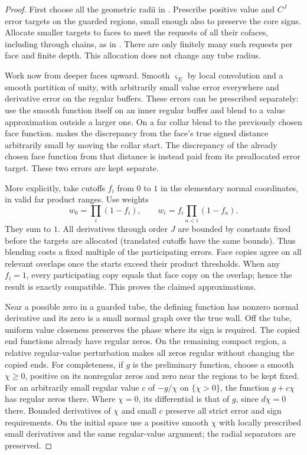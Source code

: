 \begin{proof}
First choose all the geometric radii in .  Prescribe
positive value and $C^J$ error targets on the guarded regions, small
enough also to preserve the core signs.  Allocate smaller targets to
faces to meet the requests of all their cofaces, including through
chains, as in .  There are only finitely many
such requests per face and finite depth.  This allocation does not
change any tube radius.

Work now from deeper faces upward.  Smooth $\varsigma_E$ by local
convolution and a smooth partition of unity, with arbitrarily small
value error everywhere and derivative error on the regular buffers.
These errors can be prescribed separately: use the smooth function
itself on an inner regular buffer and blend to a value approximation
outside a larger one.  On a far collar blend to the previously chosen
face function.   makes the discrepancy from the
face's true signed distance arbitrarily small by moving the collar
start.  The discrepancy of the already chosen face function from that
distance is instead paid from its preallocated error target.  These
two errors are kept separate.

More explicitly, take cutoffs $f_i$ from $0$ to $1$ in the elementary
normal coordinates, in valid far product ranges.  Use weights
\[
 w_0=\prod_i(1-f_i),\qquad
 w_i=f_i\prod_{a<i}(1-f_a).
\]
They sum to $1$.  All derivatives through order $J$ are bounded by
constants fixed before the targets are allocated (translated cutoffs
have the same bounds).  Thus blending costs a fixed multiple of the
participating errors.  Face copies agree on all relevant overlaps once
the starts exceed their product thresholds.  When any $f_i=1$, every
participating copy equals that face copy on the overlap; hence the
result is exactly compatible.  This proves the claimed approximations.

Near a possible zero in a guarded tube, the defining function has
nonzero normal derivative and its zero is a small normal graph over the
true wall.  Off the tube, uniform value closeness preserves the phase
where its sign is required.  The copied end functions already have
regular zeros.  On the remaining compact region, a relative regular-value
perturbation makes all zeros regular without changing the copied ends.
For completeness, if $g$ is the preliminary function, choose a smooth
$\chi\ge0$, positive on its nonregular zeros and zero near the regions
to be kept fixed.  For an arbitrarily small regular value $c$ of
$-g/\chi$ on $\{\chi>0\}$, the function $g+c\chi$ has regular zeros
there.  Where $\chi=0$, its differential is that of $g$, since
$d\chi=0$ there.  Bounded derivatives of $\chi$ and small $c$ preserve
all strict error and sign requirements.  On the initial space use a
positive smooth $\chi$ with locally prescribed small derivatives and
the same regular-value argument; the radial separators are preserved.


\end{proof}
